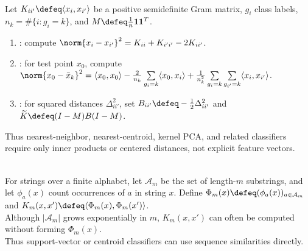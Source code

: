 \begin{method} \label{meth:sl-inner-product-and-distance-only-classifiers} \\
Let $K_{ii'}\defeq\langle x_i,x_{i'}\rangle$ be a positive semidefinite Gram matrix, $g_i$ class labels, $n_k=\#\{i:g_i=k\}$, and $M\defeq\frac{1}{n}\mathbf{1}\mathbf{1}^T$.
\begin{enumerate}[label=(\roman*)]
\setlength{\itemsep}{0pt}
\item {}: compute $\norm{x_i-x_{i'}}^2=K_{ii}+K_{i'i'}-2K_{ii'}$.
\item {}: for test point $x_0$, compute $\norm{x_0-\bar{x}_k}^2=\langle x_0,x_0\rangle-\frac{2}{n_k}\sum\limits_{g_i=k}\langle x_0,x_i\rangle+\frac{1}{n_k^2}\sum\limits_{g_i=k}\sum\limits_{g_{i'}=k}\langle x_i,x_{i'}\rangle$.
\item {}: for squared distances $\Delta_{ii'}^2$, set $B_{ii'}\defeq-\frac{1}{2}\Delta_{ii'}^2$ and $\widetilde{K}\defeq(I-M)B(I-M)$.
\end{enumerate}
Thus nearest-neighbor, nearest-centroid, kernel PCA, and related classifiers require only inner products or centered distances, not explicit feature vectors.
\end{method}

\begin{example} \label{ex:sl-string-kernel-high-dimensional-features} \\
For strings over a finite alphabet, let $\mathcal{A}_m$ be the set of length-$m$ substrings, and let $\phi_a(x)$ count occurrences of $a$ in string $x$. Define $\Phi_m(x)\defeq(\phi_a(x))_{a\in\mathcal{A}_m}$ and $K_m(x,x')\defeq\langle\Phi_m(x),\Phi_m(x')\rangle$.\\
Although $|\mathcal{A}_m|$ grows exponentially in $m$, $K_m(x,x')$ can often be computed without forming $\Phi_m(x)$.\\
Thus support-vector or centroid classifiers can use sequence similarities directly.
\end{example}

